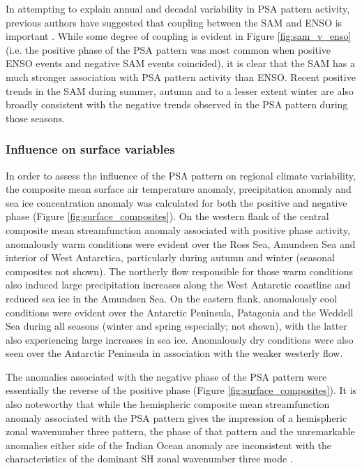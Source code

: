 In attempting to explain annual and decadal variability in PSA pattern activity, previous authors have suggested that coupling between the SAM and ENSO is important \citep[e.g.][]{Fogt2006}. While some degree of coupling is evident in Figure \ref{fig:sam_v_enso} (i.e. the positive phase of the PSA pattern was most common when positive ENSO events and negative SAM events coincided), it is clear that the SAM has a much stronger association with PSA pattern activity than ENSO. Recent positive trends in the SAM during summer, autumn and to a lesser extent winter \citep[the latter being smaller and not statistically significant; e.g.][]{Simmonds2015} are also broadly consistent with the negative trends observed in the PSA pattern during those seasons.  

\subsubsection{Influence on surface variables} 

In order to assess the influence of the PSA pattern on regional climate variability, the composite mean surface air temperature anomaly, precipitation anomaly and sea ice concentration anomaly was calculated for both the positive and negative phase (Figure \ref{fig:surface_composites}). On the western flank of the central composite mean streamfunction anomaly associated with positive phase activity, anomalously warm conditions were evident over the Ross Sea, Amundsen Sea and interior of West Antarctica, particularly during autumn and winter (seasonal composites not shown). The northerly flow responsible for those warm conditions also induced large precipitation increases along the West Antarctic coastline and reduced sea ice in the Amundsen Sea. On the eastern flank, anomalously cool conditions were evident over the Antarctic Peninsula, Patagonia and the Weddell Sea during all seasons (winter and spring especially; not shown), with the latter also experiencing large increases in sea ice. Anomalously dry conditions were also seen over the Antarctic Peninsula in association with the weaker westerly flow. 

The anomalies associated with the negative phase of the PSA pattern were essentially the reverse of the positive phase (Figure \ref{fig:surface_composites}). It is also noteworthy that while the hemispheric composite mean streamfunction anomaly associated with the PSA pattern gives the impression of a hemispheric zonal wavenumber three pattern, the phase of that pattern and the unremarkable anomalies either side of the Indian Ocean anomaly are inconsistent with the characteristics of the dominant SH zonal wavenumber three mode \citep[e.g.][]{Raphael2004,IrvingSimmonds2015}.



